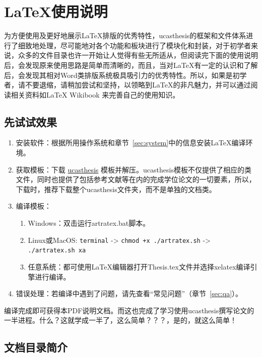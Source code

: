 \chapter{\LaTeX{}使用说明}\label{chap:guide}

为方便使用及更好地展示\LaTeX{}排版的优秀特性，ucasthesis的框架和文件体系进行了细致地处理，尽可能地对各个功能和板块进行了模块化和封装，对于初学者来说，众多的文件目录也许一开始让人觉得有些无所适从，但阅读完下面的使用说明后，会发现原来使用思路是简单而清晰的，而且，当对\LaTeX{}有一定的认识和了解后，会发现其相对Word类排版系统极具吸引力的优秀特性。所以，如果是初学者，请不要退缩，请稍加尝试和坚持，以领略到\LaTeX{}的非凡魅力，并可以通过阅读相关资料如\LaTeX{} Wikibook \citep{wikibook2014latex} 来完善自己的使用知识。


\section{先试试效果}

\begin{enumerate}
    \item 安装软件：根据所用操作系统和章节~\ref{sec:system}中的信息安装\LaTeX{}编译环境。
    \item 获取模板：下载 \href{https://github.com/mohuangrui/ucasthesis}{ucasthesis} 模板并解压。ucasthesis模板不仅提供了相应的类文件，同时也提供了包括参考文献等在内的完成学位论文的一切要素，所以，下载时，推荐下载整个ucasthesis文件夹，而不是单独的文档类。
    \item 编译模板：
    \begin{enumerate}
        \item Windows：双击运行artratex.bat脚本。
        \item Linux或MacOS: {\scriptsize \verb|terminal| -> \verb|chmod +x ./artratex.sh| -> \verb|./artratex.sh xa|}
        \item 任意系统：都可使用\LaTeX{}编辑器打开Thesis.tex文件并选择xelatex编译引擎进行编译。
    \end{enumerate}
    \item 错误处理：若编译中遇到了问题，请先查看“常见问题”（章节~\ref{sec:qa}）。
\end{enumerate}

编译完成即可获得本PDF说明文档。而这也完成了学习使用ucasthesis撰写论文的一半进程。什么？这就学成一半了，这么简单？？？，是的，就这么简单！


\section{文档目录简介}

